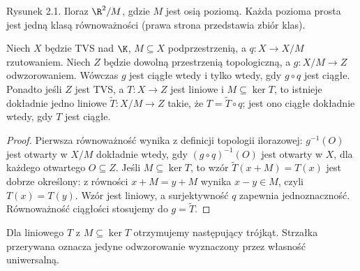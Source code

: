 \begin{center}

{\small Rysunek 2.1. Iloraz $\R^2/M$, gdzie $M$ jest osią poziomą.
Każda pozioma prosta jest jedną klasą równoważności
(prawa strona przedstawia zbiór klas).}
\end{center}

\begin{twierdzenie}\label{thm:quotient-universal}
Niech $X$ będzie TVS nad $\K$, $M\subseteq X$ podprzestrzenią,
a $q:X\to X/M$ rzutowaniem. Niech $Z$ będzie dowolną
przestrzenią topologiczną, a $g:X/M\to Z$ odwzorowaniem.
Wówczas $g$ jest ciągłe wtedy i tylko wtedy,
gdy $g\circ q$ jest ciągłe. Ponadto jeśli $Z$ jest TVS,
a $T:X\to Z$ jest liniowe i $M\subseteq\ker T$, to
istnieje dokładnie jedno liniowe $\widetilde T:X/M\to Z$
takie, że $T=\widetilde T\circ q$; jest ono ciągłe
dokładnie wtedy, gdy $T$ jest ciągłe.
\end{twierdzenie}


\begin{proof}
Pierwsza równoważność wynika z definicji topologii ilorazowej:
$g^{-1}(O)$ jest otwarty w $X/M$ dokładnie wtedy,
gdy $(g\circ q)^{-1}(O)$ jest otwarty w $X$, dla każdego
otwartego $O\subseteq Z$. Jeśli $M\subseteq\ker T$,
to wzór $\widetilde T(x+M)=T(x)$ jest dobrze określony:
z równości $x+M=y+M$ wynika $x-y\in M$, czyli $T(x)=T(y)$.
Wzór jest liniowy, a surjektywność $q$ zapewnia jednoznaczność.
Równoważność ciągłości stosujemy do $g=\widetilde T$.
\end{proof}

Dla liniowego $T$ z $M\subseteq\ker T$ otrzymujemy następujący trójkąt. Strzałka przerywana oznacza jedyne odwzorowanie wyznaczony przez własność uniwersalną.
\begin{center}
\end{center}

